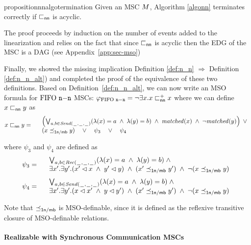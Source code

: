 \begin{restatable}{proposition}{nnalgotermination}
\label{prop:nn_algo_term}
	Given an MSC $M$, Algorithm \ref{algonn}  terminates correctly if $\sqsubset_{\mathsf{nn}}$ is acyclic.
\end{restatable}

The proof  proceeds by induction on the number of events added to the linearization and relies on the fact that since $\sqsubset_{\mathsf{nn}}$ is acyclic then the EDG of the MSC is a DAG 
(see Appendix~\ref{app:sec-mso})


Finally, we showed the missing implication
Definition \ref{def:n_n} $\Rightarrow$ Definition \ref{def:n_n_alt}) and completed the proof of the equivalence of these two definitions. Based on Definition~\ref{def:n_n_alt}, we can now write an MSO formula for $\text{FIFO } \mathtt{n\mathsf{-}n}$ MSCs:
$
	\varphi_{\text{FIFO } \mathtt{n\mathsf{-}n}} = \neg \exists x. x \sqsubset_{\mathsf{nn}}^{+} x 
$
where we can define $x \sqsubset_{\mathsf{nn}} y$ as
\[
	x \sqsubset_{\mathsf{nn}} y =
	\begin{array}{rl}
	& \left(
		\bigvee_{\substack{a,b \in {\mathit{Send}(\hspace{0.1em}\underline{\hspace{0.5em}}\hspace{0.1em},\hspace{0.1em}\underline{\hspace{0.5em}}\hspace{0.1em},\hspace{0.1em}\underline{\hspace{0.5em}}\hspace{0.1em})}}}
		(\lambda(x) = a \;\wedge\; \lambda(y) = b)
		\;\wedge\; \mathit{matched}(x) \;\wedge\; \neg \mathit{matched}(y)
	\right) \;\vee\\
	& (x \preceq_{\mathsf{1n/\mathsf{mb}}} y) \quad \vee \quad \psi_3 \quad \vee \quad \psi_4\\
	\end{array}
\]

\noindent where $\psi_3$ and $\psi_4$ are defined as
\[
	\psi_3 =
	\begin{array}{rl}
		& \bigvee_{\substack{a,b \in {\mathit{Rec}(\hspace{0.1em}\underline{\hspace{0.5em}}\hspace{0.1em},\hspace{0.1em}\underline{\hspace{0.5em}}\hspace{0.1em},\hspace{0.1em}\underline{\hspace{0.5em}}\hspace{0.1em})}}}
		  (\lambda(x) = a \;\wedge\; \lambda(y) = b)
		  \;\wedge\; \\
		& \exists x'.\exists y'.(x' \lhd x \;\wedge\; y' \lhd y) \;\wedge\; (x' \preceq_{\mathsf{1n/\mathsf{mb}}} y') \;\wedge\; \neg(x \preceq_{\mathsf{1n/\mathsf{mb}}} y)\\
	\end{array}
\]
\[
	\psi_4 =
	\begin{array}{rl}
		& \bigvee_{\substack{a,b \in {\mathit{Send}(\hspace{0.1em}\underline{\hspace{0.5em}}\hspace{0.1em},\hspace{0.1em}\underline{\hspace{0.5em}}\hspace{0.1em},\hspace{0.1em}\underline{\hspace{0.5em}}\hspace{0.1em})}}}
		  (\lambda(x) = a \;\wedge\; \lambda(y) = b)
		  \;\wedge\; \\
		& \exists x'.\exists y'.(x \lhd x' \;\wedge\; y \lhd y') \;\wedge\; (x' \preceq_{\mathsf{1n/\mathsf{mb}}} y') \;\wedge\; \neg(x \preceq_{\mathsf{1n/\mathsf{mb}}} y)\\
	\end{array}
\]

Note that $\preceq_{\mathsf{1n/\mathsf{mb}}}$ is MSO-definable, since it is defined as the reflexive transitive closure of MSO-definable relations.

\paragraph{\bf Realizable with Synchronous Communication MSCs} 

